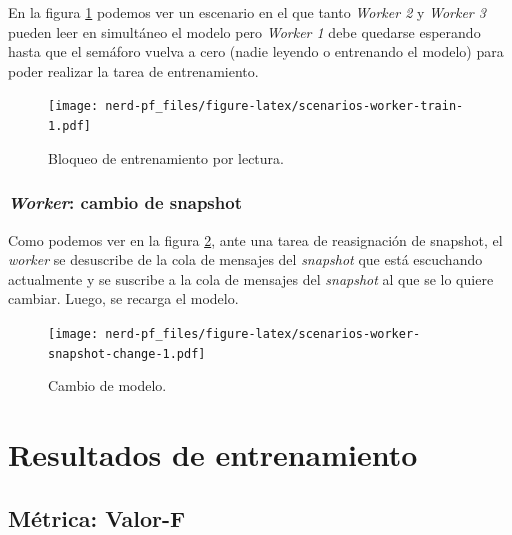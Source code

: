 \documentclass[12pt,a4paper,]{scrartcl}
\begin{document}
En la figura \ref{fig:scenarios-worker-train} podemos ver un escenario en el que tanto \emph{Worker 2} y \emph{Worker 3} pueden leer en simultáneo el modelo pero \emph{Worker 1} debe quedarse esperando hasta que el semáforo vuelva a cero (nadie leyendo o entrenando el modelo) para poder realizar la tarea de entrenamiento.

\begin{figure}[H]

{\centering \texttt{[image: nerd-pf\_files/figure-latex/scenarios-worker-train-1.pdf]} 

}

\caption{Bloqueo de entrenamiento por lectura.}\label{fig:scenarios-worker-train}
\end{figure}

\hypertarget{worker-cambio-de-snapshot}{%
\subsubsection{\texorpdfstring{\emph{Worker}: cambio de snapshot}{Worker: cambio de snapshot}}\label{worker-cambio-de-snapshot}}

Como podemos ver en la figura \ref{fig:scenarios-worker-snapshot-change}, ante una tarea de reasignación de snapshot, el \emph{worker} se desuscribe de la cola de mensajes del \emph{snapshot} que está escuchando actualmente y se suscribe a la cola de mensajes del \emph{snapshot} al que se lo quiere cambiar. Luego, se recarga el modelo.

\begin{figure}[H]

{\centering \texttt{[image: nerd-pf\_files/figure-latex/scenarios-worker-snapshot-change-1.pdf]} 

}

\caption{Cambio de modelo.}\label{fig:scenarios-worker-snapshot-change}
\end{figure}

\newpage

\hypertarget{results}{%
\section{Resultados de entrenamiento}\label{results}}

\hypertarget{muxe9trica-valor-f}{%
\subsection{Métrica: Valor-F}\label{muxe9trica-valor-f}}
\end{document}
